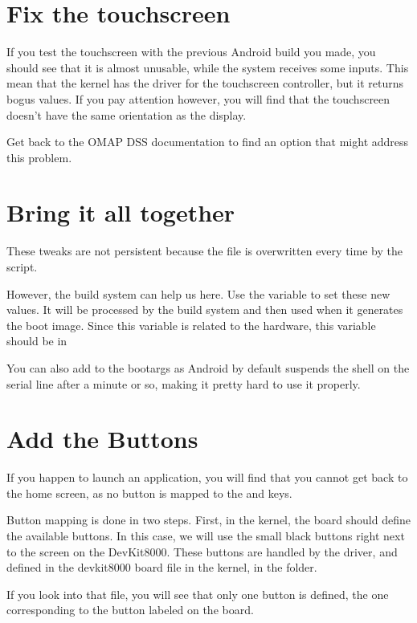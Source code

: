 \section{Fix the touchscreen}

If you test the touchscreen with the previous Android build you made,
you should see that it is almost unusable, while the system receives
some inputs. This mean that the kernel has the driver for the
touchscreen controller, but it returns bogus values. If you pay
attention however, you will find that the touchscreen doesn't have the
same orientation as the display.

Get back to the OMAP DSS documentation to find an option that might
address this problem.

\section{Bring it all together}

These tweaks are not persistent because the  file is
overwritten every time by the 
script.

However, the build system can help us here. Use the
 variable to set these new values. It will
be processed by the build system and then used when it generates the
boot image. Since this variable is related to the hardware, this
variable should be in 

You can also add  to the bootargs as Android
by default suspends the shell on the serial line after a minute or so,
making it pretty hard to use it properly.

\section{Add the Buttons}

If you happen to launch an application, you will find that you cannot
get back to the home screen, as no button is mapped to the 
and  keys.

Button mapping is done in two steps. First, in the kernel, the board
should define the available buttons. In this case, we will use the
small black buttons right next to the screen on the DevKit8000. These
buttons are handled by the  driver, and defined in the
devkit8000 board file in the kernel, in the 
folder.

If you look into that file, you will see that only one button is
defined, the one corresponding to the button labeled 
on the board.

